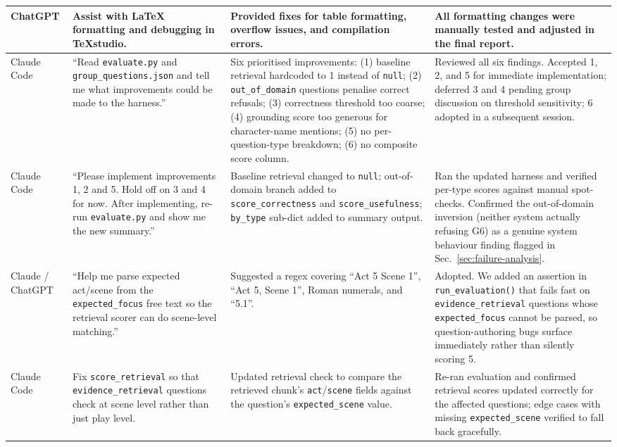 \documentclass[10pt,conference]{IEEEtran}
\begin{document}
\begin{table}[!htbp]
\begin{tabularx}{\textwidth}{p{1.6cm} p{2.6cm} p{3.0cm} X}
ChatGPT
& Assist with LaTeX formatting and debugging in TeXstudio.
& Provided fixes for table formatting, overflow issues, and compilation errors.
& All formatting changes were manually tested and adjusted in the final report. \\
\midrule
Claude Code
& ``Read \texttt{evaluate.py} and \texttt{group\_questions.json} and tell me what improvements could be made to the harness.''
& Six prioritised improvements: (1) baseline retrieval hardcoded to 1 instead of \texttt{null}; (2) \texttt{out\_of\_domain} questions penalise correct refusals; (3) correctness threshold too coarse; (4) grounding score too generous for character-name mentions; (5) no per-question-type breakdown; (6) no composite score column.
& Reviewed all six findings. Accepted 1, 2, and 5 for immediate implementation; deferred 3 and 4 pending group discussion on threshold sensitivity; 6 adopted in a subsequent session. \\
\midrule
Claude Code
& ``Please implement improvements 1, 2 and 5. Hold off on 3 and 4 for now. After implementing, re-run \texttt{evaluate.py} and show me the new summary.''
& Baseline retrieval changed to \texttt{null}; out-of-domain branch added to \texttt{score\_correctness} and \texttt{score\_usefulness}; \texttt{by\_type} sub-dict added to summary output.
& Ran the updated harness and verified per-type scores against manual spot-checks. Confirmed the out-of-domain inversion (neither system actually refusing G6) as a genuine system behaviour finding flagged in Sec.~\ref{sec:failure-analysis}. \\
\midrule
Claude / ChatGPT
& ``Help me parse expected act/scene from the \texttt{expected\_focus} free text so the retrieval scorer can do scene-level matching.''
& Suggested a regex covering ``Act 5 Scene 1'', ``Act 5, Scene 1'', Roman numerals, and ``5.1''.
& Adopted. We added an assertion in \verb|run_evaluation()| that fails fast on \texttt{evidence\_retrieval} questions whose \texttt{expected\_focus} cannot be parsed, so question-authoring bugs surface immediately rather than silently scoring 5. \\
\midrule
Claude Code
& Fix \texttt{score\_retrieval} so that \texttt{evidence\_retrieval} questions check at scene level rather than just play level.
& Updated retrieval check to compare the retrieved chunk's \texttt{act}/\texttt{scene} fields against the question's \texttt{expected\_scene} value.
& Re-ran evaluation and confirmed retrieval scores updated correctly for the affected questions; edge cases with missing \texttt{expected\_scene} verified to fall back gracefully. \\

\end{tabularx}
\end{table}
\end{document}
